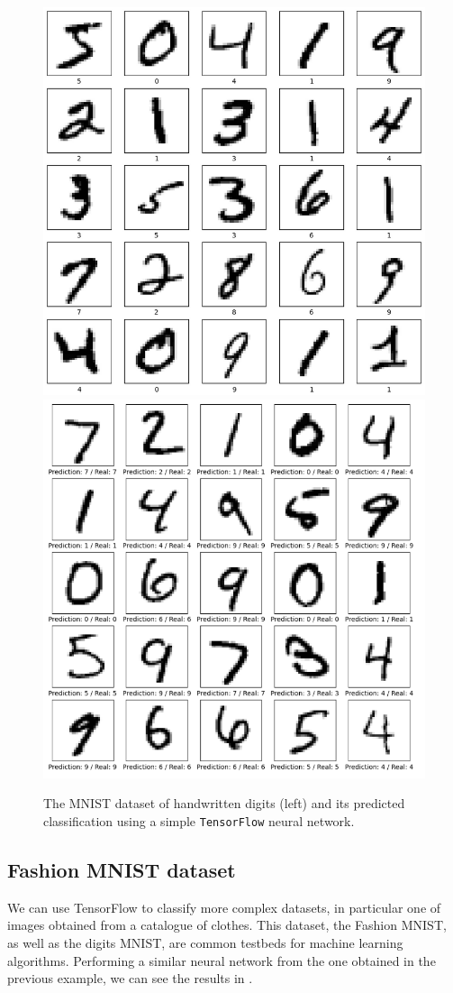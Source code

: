 \documentclass[]{report}
\begin{document}
\begin{figure}\centering
\includegraphics[width = .475\linewidth]{images/mnist}
\includegraphics[width = .485\linewidth]{images/prediction-mnist}
\caption{The MNIST dataset of handwritten digits (left) and its predicted classification using a simple \texttt{TensorFlow} neural network.}
\label{fig.mnist}
\end{figure}

\subsection{Fashion MNIST dataset}

We can use TensorFlow to classify more complex datasets, in particular one of images obtained from a catalogue of clothes. This dataset, the Fashion MNIST, as well as the digits MNIST, are common testbeds for machine learning algorithms. Performing a similar neural network from the one obtained in the previous example, we can see the results in . 
\end{document}
